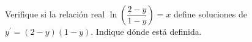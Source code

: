 Verifique si la relación real $\ln\!\left(\dfrac{2-y}{1-y}\right)=x$ define soluciones de $y^{\prime}=(2-y)(1-y)$. Indique dónde está definida.
